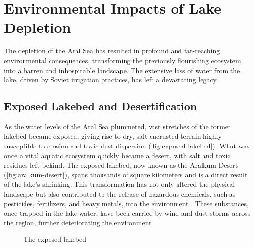 

\chapter[Environmental Impacts of Lake Depletion]{Environmental Impacts of Lake Depletion}
\label{cp:environmental-impact}

\vspace{.935em}

The depletion of the Aral Sea has resulted in profound and far-reaching environmental consequences, transforming the previously flourishing ecosystem into a barren and inhospitable landscape. The extensive loss of water from the lake, driven by Soviet irrigation practices, has left a devastating legacy.

\section{Exposed Lakebed and Desertification}
As the water levels of the Aral Sea plummeted, vast stretches of the former lakebed became exposed, giving rise to dry, salt-encrusted terrain highly susceptible to erosion and toxic dust dispersion (\autoref{fig:exposed-lakebed}). What was once a vital aquatic ecosystem quickly became a desert, with salt and toxic residues left behind. The exposed lakebed, now known as the Aralkum Desert (\autoref{fig:aralkum-desert}), spans thousands of square kilometers and is a direct result of the lake’s shrinking. This transformation has not only altered the physical landscape but also contributed to the release of hazardous chemicals, such as pesticides, fertilizers, and heavy metals, into the environment \autocite{chen_dust}. These substances, once trapped in the lake water, have been carried by wind and dust storms across the region, further deteriorating the environment.

\begin{figure}[htpb]
    \centering
{}
    \caption{The exposed lakebed}
    \label{fig:exposed-lakebed}
\end{figure}

